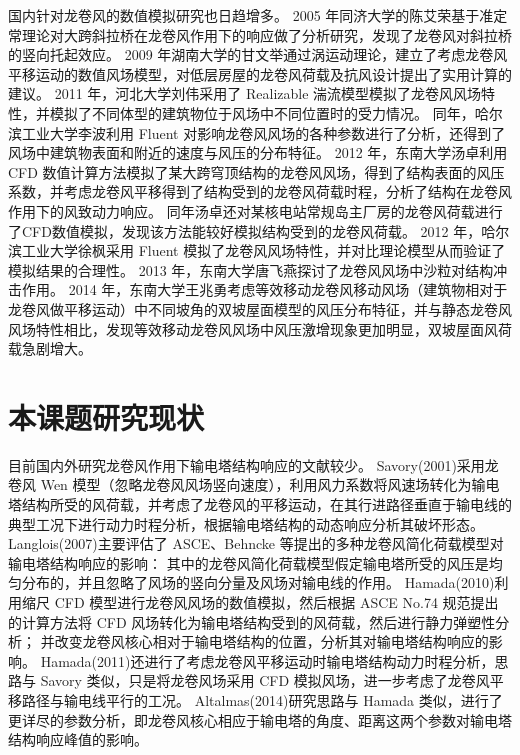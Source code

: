 国内针对龙卷风的数值模拟研究也日趋增多。
2005 年同济大学的陈艾荣\cite{chen2004large}基于准定常理论对大跨斜拉桥在龙卷风作用下的响应做了分析研究，发现了龙卷风对斜拉桥的竖向托起效应。
2009 年湖南大学的甘文举\cite{gan2009low}通过涡运动理论，建立了考虑龙卷风平移运动的数值风场模型，对低层房屋的龙卷风荷载及抗风设计提出了实用计算的建议。
2011 年，河北大学刘伟\cite{liu2011lou}采用了 Realizable 湍流模型模拟了龙卷风风场特性，并模拟了不同体型的建筑物位于风场中不同位置时的受力情况。
同年，哈尔滨工业大学李波利用 Fluent 对影响龙卷风风场的各种参数进行了分析，还得到了风场中建筑物表面和附近的速度与风压的分布特征。
2012 年，东南大学汤卓\cite{tang2012tornado}利用 CFD 数值计算方法模拟了某大跨穹顶结构的龙卷风风场，得到了结构表面的风压系数，并考虑龙卷风平移得到了结构受到的龙卷风荷载时程，分析了结构在龙卷风作用下的风致动力响应。
同年汤卓\cite{tang2012nuclear}还对某核电站常规岛主厂房的龙卷风荷载进行了CFD数值模拟，发现该方法能较好模拟结构受到的龙卷风荷载。
2012 年，哈尔滨工业大学徐枫\cite{xu2013tornado}采用 Fluent 模拟了龙卷风风场特性，并对比理论模型从而验证了模拟结果的合理性。
2013 年，东南大学唐飞燕\cite{tang2013tornado}探讨了龙卷风风场中沙粒对结构冲击作用。
2014 年，东南大学王兆勇\cite{wang2015different}考虑等效移动龙卷风移动风场（建筑物相对于龙卷风做平移运动）中不同坡角的双坡屋面模型的风压分布特征，并与静态龙卷风风场特性相比，发现等效移动龙卷风风场中风压激增现象更加明显，双坡屋面风荷载急剧增大。

\section{本课题研究现状}

目前国内外研究龙卷风作用下输电塔结构响应的文献较少。
Savory(2001)\cite{savory2001modelling}采用龙卷风 Wen 模型（忽略龙卷风风场竖向速度），利用风力系数将风速场转化为输电塔结构所受的风荷载，并考虑了龙卷风的平移运动，在其行进路径垂直于输电线的典型工况下进行动力时程分析，根据输电塔结构的动态响应分析其破坏形态。
Langlois(2007)\cite{langlois2007design}主要评估了 ASCE、Behncke 等提出的多种龙卷风简化荷载模型对输电塔结构响应的影响：
其中的龙卷风简化荷载模型假定输电塔所受的风压是均匀分布的，并且忽略了风场的竖向分量及风场对输电线的作用。
Hamada(2010)\cite{hamada2010finite}利用缩尺 CFD 模型进行龙卷风风场的数值模拟，然后根据 ASCE No.74 规范提出的计算方法将 CFD 风场转化为输电塔结构受到的风荷载，然后进行静力弹塑性分析；
并改变龙卷风核心相对于输电塔结构的位置，分析其对输电塔结构响应的影响。
Hamada(2011)还进行了考虑龙卷风平移运动时输电塔结构动力时程分析，思路与 Savory 类似，只是将龙卷风场采用 CFD 模拟风场，进一步考虑了龙卷风平移路径与输电线平行的工况。
Altalmas(2014)\cite{altalmas2014finite}研究思路与 Hamada 类似，进行了更详尽的参数分析，即龙卷风核心相应于输电塔的角度、距离这两个参数对输电塔结构响应峰值的影响。

